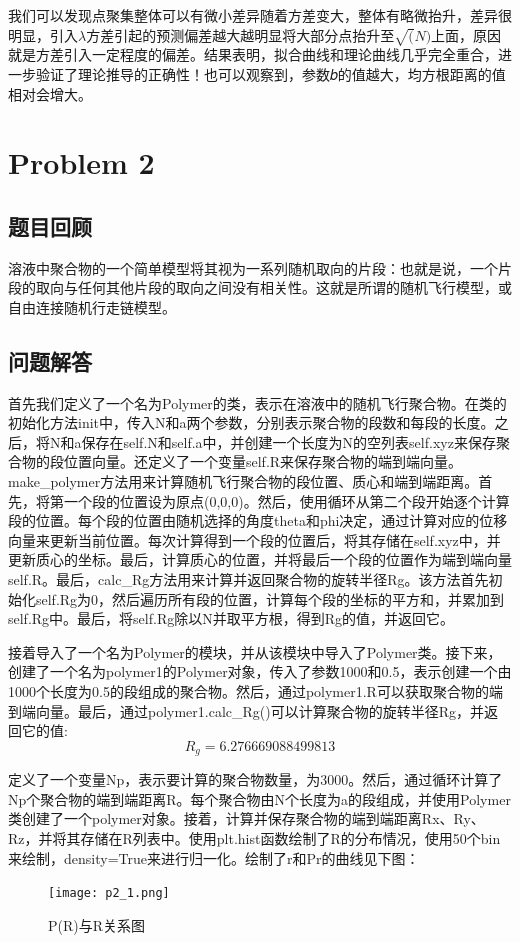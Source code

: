 \documentclass[12pt,a4paper]{article}%
\begin{document}
我们可以发现点聚集整体可以有微小差异随着方差变大，整体有略微抬升，差异很明显，引入$\lambda$方差引起的预测偏差越大越明显将大部分点抬升至$\sqrt(N)$上面，原因就是方差引入一定程度的偏差。结果表明，拟合曲线和理论曲线几乎完全重合，进一步验证了理论推导的正确性！也可以观察到，参数𝑏的值越大，均方根距离的值相对会增大。

\section{Problem 2}
\subsection{题目回顾}
溶液中聚合物的一个简单模型将其视为一系列随机取向的片段：也就是说，一个片段的取向与任何其他片段的取向之间没有相关性。这就是所谓的随机飞行模型，或自由连接随机行走链模型。
\subsection{问题解答}
首先我们定义了一个名为Polymer的类，表示在溶液中的随机飞行聚合物。在类的初始化方法init中，传入N和a两个参数，分别表示聚合物的段数和每段的长度。之后，将N和a保存在self.N和self.a中，并创建一个长度为N的空列表self.xyz来保存聚合物的段位置向量。还定义了一个变量self.R来保存聚合物的端到端向量。make\_polymer方法用来计算随机飞行聚合物的段位置、质心和端到端距离。首先，将第一个段的位置设为原点(0,0,0)。然后，使用循环从第二个段开始逐个计算段的位置。每个段的位置由随机选择的角度theta和phi决定，通过计算对应的位移向量来更新当前位置。每次计算得到一个段的位置后，将其存储在self.xyz中，并更新质心的坐标。最后，计算质心的位置，并将最后一个段的位置作为端到端向量self.R。最后，calc\_Rg方法用来计算并返回聚合物的旋转半径Rg。该方法首先初始化self.Rg为0，然后遍历所有段的位置，计算每个段的坐标的平方和，并累加到self.Rg中。最后，将self.Rg除以N并取平方根，得到Rg的值，并返回它。

接着导入了一个名为Polymer的模块，并从该模块中导入了Polymer类。接下来，创建了一个名为polymer1的Polymer对象，传入了参数1000和0.5，表示创建一个由1000个长度为0.5的段组成的聚合物。然后，通过polymer1.R可以获取聚合物的端到端向量。最后，通过polymer1.calc\_Rg()可以计算聚合物的旋转半径Rg，并返回它的值:
\[R_g=6.276669088499813\]

定义了一个变量Np，表示要计算的聚合物数量，为3000。然后，通过循环计算了Np个聚合物的端到端距离R。每个聚合物由N个长度为a的段组成，并使用Polymer类创建了一个polymer对象。接着，计算并保存聚合物的端到端距离Rx、Ry、Rz，并将其存储在R列表中。使用plt.hist函数绘制了R的分布情况，使用50个bin来绘制，density=True来进行归一化。绘制了r和Pr的曲线见下图：
\begin{figure}[htbp]
    \centering
    \texttt{[image: p2\_1.png]}\label{fig:figure4}
    \caption{P(R)与R关系图}
\end{figure}
\end{document}
